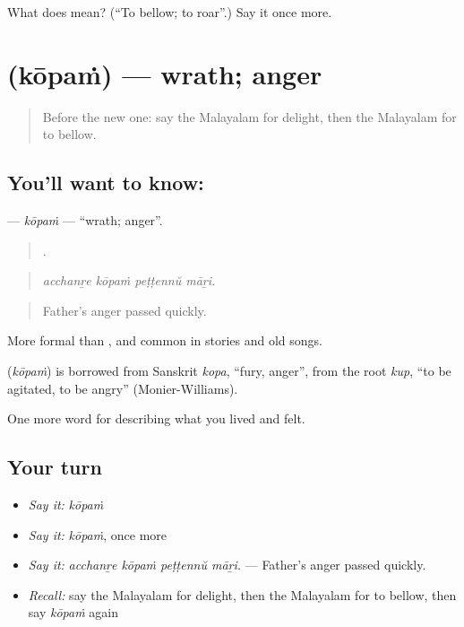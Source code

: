 \begin{tcolorbox}[breakable,colback=teal!4,colframe=teal!35!black,title={Before you move on}]
What does  mean? (\textquotedblleft{}To bellow; to roar\textquotedblright{}.) Say it once more.
\end{tcolorbox}
\section[\texorpdfstring{\ml{കോപം} (kōpaṁ)}{കോപം (kōpaṁ)}]{ (kōpaṁ) — wrath; anger}

\label{lesson:ML-C517-kopam}



\begin{quote}
Before the new one: say the Malayalam for delight, then the Malayalam for to bellow.
\end{quote}

\subsection*{You'll want to know: }
\textbf{} — \emph{kōpaṁ} — \textquotedblleft{}wrath; anger\textquotedblright{}.

\begin{quote}
   .
\end{quote}

\begin{quote}
\emph{acchanṟe kōpaṁ peṭṭennŭ māṟi.}
\end{quote}

\begin{quote}
Father's anger passed quickly.
\end{quote}

More formal than , and common in stories and old songs.

\begin{cousinweb}
\textbf{} (\emph{kōpaṁ}) is borrowed from Sanskrit \emph{kopa}, \textquotedblleft{}fury, anger\textquotedblright{}, from the root \emph{kup}, \textquotedblleft{}to be agitated, to be angry\textquotedblright{} (Monier-Williams).
\end{cousinweb}

\begin{grammarlens}[title={What you've built}]
One more word for describing what you lived and felt.
\end{grammarlens}

\subsection*{Your turn}
\begin{itemize}
\raggedright
  \item \emph{Say it:} \emph{kōpaṁ}
  \item \emph{Say it:} \emph{kōpaṁ}, once more
  \item \emph{Say it:} \emph{acchanṟe kōpaṁ peṭṭennŭ māṟi.} — Father's anger passed quickly.
  \item \emph{Recall:} say the Malayalam for delight, then the Malayalam for to bellow, then say \emph{kōpaṁ} again
\end{itemize}

